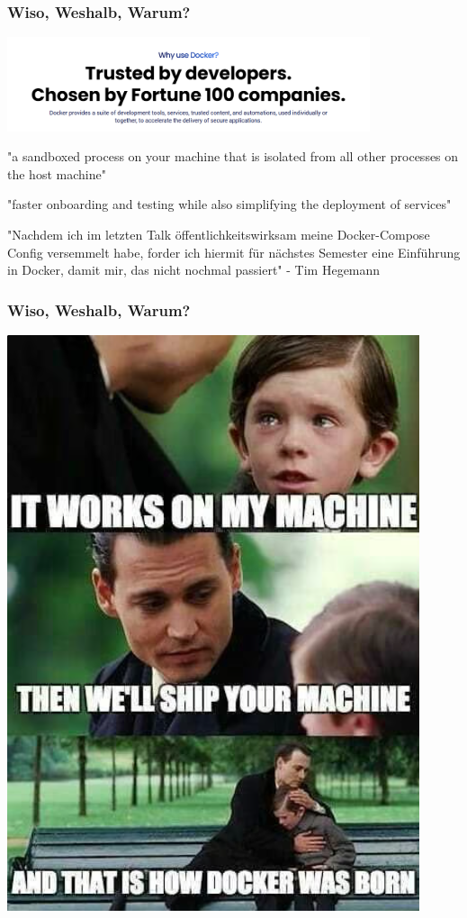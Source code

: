 \documentclass[22pt]{beamer}
\begin{document}
\begin{frame}[t]
    \frametitle{Wiso, Weshalb, Warum?}
    \begin{center}
        \includegraphics[width=0.8\textwidth]{Bilder/docker-why.png}
    \end{center}\pause
    \begin{center}
        "a sandboxed process on your machine that is isolated from all other processes on the host machine"
    \end{center}\pause
    \begin{center}
        "faster onboarding and testing while also simplifying the deployment of services"
    \end{center}\pause
    \begin{center}
        "Nachdem ich im letzten Talk öffentlichkeitswirksam meine Docker-Compose Config versemmelt habe, forder ich hiermit für nächstes Semester eine Einführung in Docker, damit mir, das nicht nochmal passiert" - Tim Hegemann
    \end{center}
\end{frame}

\begin{frame}
    \frametitle{Wiso, Weshalb, Warum?}
    \begin{center}
        \includegraphics[height=0.8\textheight]{Bilder/Meme.png}
    \end{center}
\end{frame}
\end{document}
